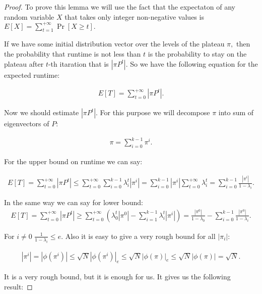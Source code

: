 \documentclass{article}
\begin{document}
\begin{proof}
  To prove this lemma we will use the fact that the expectaton of any random variable $X$ that takes only integer non-negative values is $E[X] = \sum\limits_{t = 1}^{+\infty} \Pr[X \ge t].$

  If we have some initial distribution vector over the levels of the plateau $\pi,$ then the probability that runtime is not less than $t$ is the probability to stay on the plateau after $t$-th itaration that is $|\pi P^t|.$ So we have the following equation for the expected runtime:

\begin{align*}
  E[T] = \sum\limits_{t = 0}^{+\infty} |\pi P^t|.
\end{align*}

Now we should estimate $|\pi P^t|.$ For this purpose we will decompose $\pi$ into sum of eigenvectors of $P:$

\begin{align*}
  \pi = \sum\limits_{i = 0}^{k - 1} \pi^i.
\end{align*}

For the upper bound on runtime we can say:

\begin{align*}
  E[T] = \sum\limits_{t = 0}^{+\infty}|\pi P^t| \le \sum\limits_{t = 0}^{+\infty} \sum\limits_{i = 0}^{k - 1} \lambda_i^t |\pi^i| = \sum\limits_{i = 0}^{k - 1} |\pi^i| \sum\limits_{t = 0}^{+\infty} \lambda_i^t = \sum\limits_{i = 0}^{k - 1} \frac{|\pi^i|}{1 - \lambda_i}.
\end{align*}

In the same way we can say for lower bound:
\begin{align*}
  E[T] = \sum\limits_{t = 0}^{+\infty}|\pi P^t| \ge \sum\limits_{t = 0}^{+\infty} \left(\lambda_0^t |\pi^0| - \sum\limits_{i = 1}^{k - 1} \lambda_i^t |\pi^i|\right) = \frac{|\pi^0|}{1 - \lambda_0} - \sum\limits_{i = 0}^{k - 1} \frac{|\pi^0|}{1 - \lambda_i}.
\end{align*}


For $i \ne 0$ $\frac{1}{1 - \lambda_i} \le e.$ Also it is easy to give a very rough bound for all $|\pi_i|:$

\begin{align*}
|\pi^i| = |\phi(\pi^i)| \le \sqrt{N}|\phi(\pi^i)|_e \le \sqrt{N}|\phi(\pi)|_e \le \sqrt{N}|\phi(\pi)| = \sqrt{N}.
\end{align*}

It is a very rough bound, but it is enough for us. It gives us the following result:


\end{proof}
\end{document}
